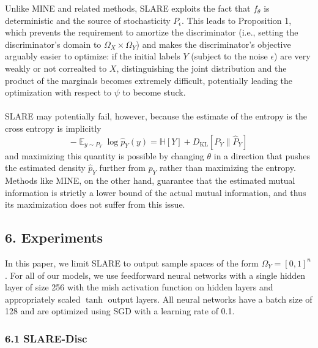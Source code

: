 \documentclass{NSF}
\newcommand{\E} {
    \mathop{\mathbb{E}}
}
\newcommand{\DKL} {
    D_{\mathrm{KL}}
}
\begin{document}
Unlike MINE \citep{belghazi2018mine} and related methods, SLARE exploits the fact that $f_\theta$ is deterministic and the source of stochasticity $P_\epsilon$. This leads to Proposition 1, which prevents the requirement to amortize the discriminator (i.e., setting the discriminator's domain to $\Omega_X \times \Omega_Y$) and makes the discriminator's objective arguably easier to optimize: if the initial labels $Y$ (subject to the noise $\epsilon$) are very weakly or not correalted to $X$, distinguishing the joint distribution and the product of the marginals becomes extremely difficult, potentially leading the optimization with respect to $\psi$ to become stuck.
\\
\\
SLARE may potentially fail, however, because the estimate of the entropy is the cross entropy is implicitly
\[
    -\E_{y\sim P_Y} \log \hat{p}_Y(y) = \mathbb{H}[Y] + \DKL[P_Y \| \hat{P}_Y]
\]
and maximizing this quantity is possible by changing $\theta$ in a direction that pushes the estimated density $\hat{p}_Y$ further from $p_Y$ rather than maximizing the entropy.
Methods like MINE, on the other hand, guarantee that the estimated mutual information is strictly a lower bound of the actual mutual information, and thus its maximization does not suffer from this issue.

\subsection{6. Experiments}

In this paper, we limit SLARE to output sample spaces of the form $\Omega_Y = [0,1]^n$.
For all of our models, we use feedforward neural networks with a single hidden layer of size 256 with the mish activation function on hidden layers \citep{misra2019mish} and appropriately scaled $\tanh$ output layers. All neural networks have a batch size of 128 and are optimized using SGD with a learning rate of 0.1.

\subsubsection{6.1 SLARE-Disc}
\end{document}
